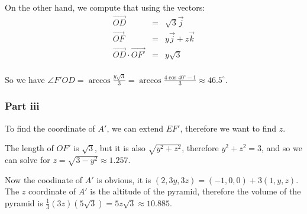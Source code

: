 On the other hand, we compute that using the vectors:
\begin{eqnarray*}
    \vec{OD} &=& \sqrt{3}\vec{j} \\
    \vec{OF} &=& y\vec{j} + z\vec{k} \\
    \vec{OD} \cdot \vec{OF'} &=& y\sqrt{3} \\
\end{eqnarray*}

So we have $ \angle F'OD = \arccos \frac{y\sqrt{3}}{3} = \arccos \frac{4 \cos 40^\circ - 1}{3} \approx 46.5^\circ $.

\subsubsection*{Part iii}
To find the coordinate of $ A' $, we can extend $ EF' $, therefore we want to find $ z $.

The length of $ OF' $ is $ \sqrt{3} $, but it is also $ \sqrt{y^2 + z^2} $, therefore $ y^2 + z^2 = 3 $, and so we can solve for $ z = \sqrt{3 - y^2} \approx 1.257 $.

Now the coodinate of $ A' $ is obvious, it is $ (2,3y,3z) = (-1,0,0) + 3(1,y,z) $. The $ z $ coordinate of $ A' $ is the altitude of the pyramid, therefore the volume of the pyramid is $ \frac{1}{3}(3z)(5\sqrt{3}) = 5z\sqrt{3} \approx 10.885 $.
